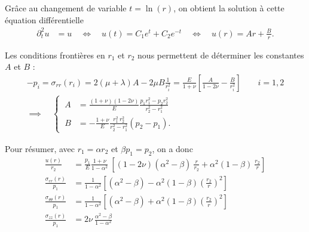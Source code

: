 \documentclass[12pt]{article}
\begin{document}
Grâce au changement de variable $t = \ln(r)$, on obtient la solution à cette 
équation différentielle
\begin{align}
    \partial_t^2 u &= u \quad\iff\quad
    u(t) = C_1 e^{t} + C_2 e^{-t} \quad\iff\quad
    u(r) = A r + \frac{B}{r}.
\end{align}

Les conditions frontières en $r_1$ et $r_2$ nous permettent de déterminer les
constantes $A$ et $B$ :
\begin{gather}
    -p_i = \sigma_{rr}(r_i) 
    = 2(\mu + \lambda) A - 2\mu B \frac{1}{r_i^2}
    = \frac{E}{1+\nu} \left[
        \frac{A}{1-2\nu} - \frac{B}{r_i^2}
    \right]
    \qquad i=1,2\\
    \implies \quad \left\{\:
    \begin{aligned}
        A &= \frac{(1+\nu)(1-2\nu)}{E} \frac{p_1 r_1^2 - p_2 r_2^2}{r_2^2 - r_1^2}\\
        B &= -\frac{1+\nu}{E} \frac{r_1^2\: r_2^2}{r_2^2-r_1^2} (p_2 - p_1) .
    \end{aligned}\right.
\end{gather}

Pour résumer, avec $r_1 = \alpha r_2$ et $\beta p_1 = p_2$, on a donc
\begin{align}
    \frac{u(r)}{r_2} &= 
    \frac{p_1}{E} \frac{1+\nu}{1 - \alpha^2} \: \left[
        (1-2\nu) (\alpha^2 - \beta) \: \frac{r}{r_2}
        + \alpha^2 (1 - \beta) \:\frac{r_2}{r}
    \right]\\
    \frac{\sigma_{rr}(r)}{p_1} &= 
    \frac{1}{1-\alpha^2} \left[
        (\alpha^2 -\beta) - 
        \alpha^2 (1 - \beta) \left(\frac{r_2}{r}\right)^2
    \right]\\
    \frac{\sigma_{\theta\theta}(r)}{p_1} &= 
        \frac{1}{1-\alpha^2} \left[
            (\alpha^2 -\beta) + 
            \alpha^2 (1 - \beta) \left(\frac{r_2}{r}\right)^2
        \right]\\
    \frac{\sigma_{zz}(r)}{p_1} &=
        2\nu \:\frac{\alpha^2 -\beta}{1-\alpha^2} 
\end{align}
\end{document}
